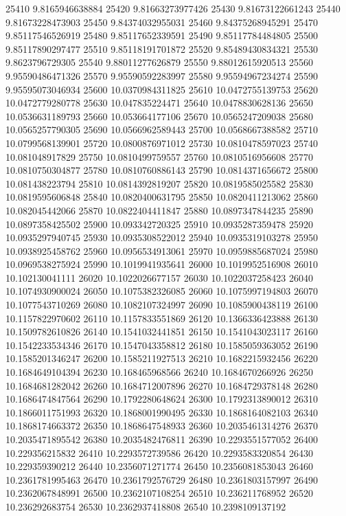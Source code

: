 {25410 9.8165946638884
25420 9.81663273977426
25430 9.81673122661243
25440 9.81673228473903
25450 9.84374032955031
25460 9.84375268945291
25470 9.85117546526919
25480 9.85117652339591
25490 9.85117784484805
25500 9.85117890297477
25510 9.85118191701872
25520 9.85489430834321
25530 9.8623796729305
25540 9.88011277626879
25550 9.88012615920513
25560 9.95590486471326
25570 9.95590592283997
25580 9.95594967234274
25590 9.95595073046934
25600 10.0370984311825
25610 10.0472755139753
25620 10.0472779280778
25630 10.047835224471
25640 10.0478830628136
25650 10.0536631189793
25660 10.053664177106
25670 10.0565247209038
25680 10.0565257790305
25690 10.0566962589443
25700 10.0568667388582
25710 10.0799568139901
25720 10.0800876971012
25730 10.0810478597023
25740 10.081048917829
25750 10.0810499759557
25760 10.0810516956608
25770 10.0810750304877
25780 10.0810760886143
25790 10.0814371656672
25800 10.081438223794
25810 10.0814392819207
25820 10.0819585025582
25830 10.0819595606848
25840 10.0820400631795
25850 10.0820411213062
25860 10.082045442066
25870 10.0822404411847
25880 10.0897347844235
25890 10.0897358425502
25900 10.093342720325
25910 10.0935287359478
25920 10.0935297940745
25930 10.0935308522012
25940 10.0935319103278
25950 10.0938925458762
25960 10.0956534913061
25970 10.0959885687024
25980 10.0969538275924
25990 10.1019941935641
26000 10.1019952516908
26010 10.102130041111
26020 10.1022026677157
26030 10.1022037258423
26040 10.1074930900024
26050 10.1075382326085
26060 10.1075997194803
26070 10.1077543710269
26080 10.1082107324997
26090 10.1085900438119
26100 10.1157822970602
26110 10.1157833551869
26120 10.1366336423888
26130 10.1509782610826
26140 10.1541032441851
26150 10.1541043023117
26160 10.1542233534346
26170 10.1547043358812
26180 10.1585059363052
26190 10.1585201346247
26200 10.1585211927513
26210 10.1682215932456
26220 10.1684649104394
26230 10.168465968566
26240 10.1684670266926
26250 10.1684681282042
26260 10.1684712007896
26270 10.1684729378148
26280 10.1686474847564
26290 10.1792280648624
26300 10.1792313890012
26310 10.1866011751993
26320 10.1868001990495
26330 10.1868164082103
26340 10.1868174663372
26350 10.1868647548933
26360 10.2035461314276
26370 10.2035471895542
26380 10.2035482476811
26390 10.2293551577052
26400 10.229356215832
26410 10.2293572739586
26420 10.2293583320854
26430 10.229359390212
26440 10.2356071271774
26450 10.2356081853043
26460 10.2361781995463
26470 10.2361792576729
26480 10.2361803157997
26490 10.2362067848991
26500 10.2362107108254
26510 10.236211768952
26520 10.236292683754
26530 10.2362937418808
26540 10.2398109137192
}
